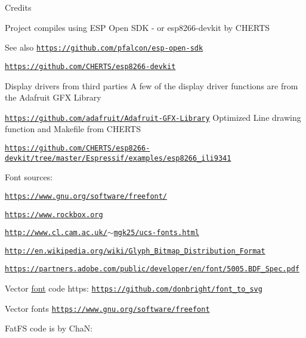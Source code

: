 \begin{DoxyParagraph}{Credits}

\begin{DoxyItemize}
\item Project compiles using E\+SP Open S\+DK -\/ or esp8266-\/devkit by C\+H\+E\+R\+TS 
\end{DoxyItemize}
\end{DoxyParagraph}
\begin{DoxySeeAlso}{See also}
\href{https://github.com/pfalcon/esp-open-sdk}{\tt https\+://github.\+com/pfalcon/esp-\/open-\/sdk} 

\href{https://github.com/CHERTS/esp8266-devkit}{\tt https\+://github.\+com/\+C\+H\+E\+R\+T\+S/esp8266-\/devkit}
\begin{DoxyItemize}
\item Display drivers from third parties A few of the display driver functions are from the Adafruit G\+FX Library 
\end{DoxyItemize}

\href{https://github.com/adafruit/Adafruit-GFX-Library}{\tt https\+://github.\+com/adafruit/\+Adafruit-\/\+G\+F\+X-\/\+Library} Optimized Line drawing function and Makefile from C\+H\+E\+R\+TS 

\href{https://github.com/CHERTS/esp8266-devkit/tree/master/Espressif/examples/esp8266_ili9341}{\tt https\+://github.\+com/\+C\+H\+E\+R\+T\+S/esp8266-\/devkit/tree/master/\+Espressif/examples/esp8266\+\_\+ili9341}
\begin{DoxyItemize}
\item Font sources\+: 
\end{DoxyItemize}

\href{https://www.gnu.org/software/freefont/}{\tt https\+://www.\+gnu.\+org/software/freefont/} 

\href{https://www.rockbox.org}{\tt https\+://www.\+rockbox.\+org} 

\href{http://www.cl.cam.ac.uk/~mgk25/ucs-fonts.html}{\tt http\+://www.\+cl.\+cam.\+ac.\+uk/$\sim$mgk25/ucs-\/fonts.\+html} 

\href{http://en.wikipedia.org/wiki/Glyph_Bitmap_Distribution_Format}{\tt http\+://en.\+wikipedia.\+org/wiki/\+Glyph\+\_\+\+Bitmap\+\_\+\+Distribution\+\_\+\+Format} 

\href{https://partners.adobe.com/public/developer/en/font/5005.BDF_Spec.pdf}{\tt https\+://partners.\+adobe.\+com/public/developer/en/font/5005.\+B\+D\+F\+\_\+\+Spec.\+pdf}
\begin{DoxyItemize}
\item Vector \hyperlink{bdffontutil_8h_a6d9c6f27190f0f04abf55678fe81080d}{font} code  https\+: \href{https://github.com/donbright/font_to_svg}{\tt https\+://github.\+com/donbright/font\+\_\+to\+\_\+svg}
\item Vector fonts  \href{https://www.gnu.org/software/freefont}{\tt https\+://www.\+gnu.\+org/software/freefont}
\item Fat\+FS code is by ChaN\+: 
\end{DoxyItemize}


\end{DoxySeeAlso}
